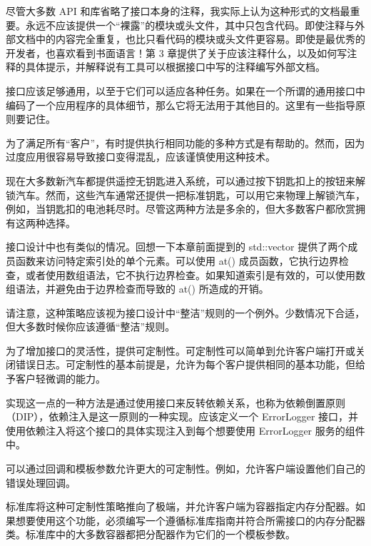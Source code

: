 尽管大多数 API 和库省略了接口本身的注释，我实际上认为这种形式的文档最重要。永远不应该提供一个“裸露”的模块或头文件，其中只包含代码。即使注释与外部文档中的内容完全重复，也比只看代码的模块或头文件更容易。即使是最优秀的开发者，也喜欢看到书面语言！第 3 章提供了关于应该注释什么，以及如何写注释的具体提示，并解释说有工具可以根据接口中写的注释编写外部文档。


接口应该足够通用，以至于它们可以适应各种任务。如果在一个所谓的通用接口中编码了一个应用程序的具体细节，那么它将无法用于其他目的。这里有一些指导原则要记住。


为了满足所有“客户”，有时提供执行相同功能的多种方式是有帮助的。然而，因为过度应用很容易导致接口变得混乱，应该谨慎使用这种技术。

现在大多数新汽车都提供遥控无钥匙进入系统，可以通过按下钥匙扣上的按钮来解锁汽车。然而，这些汽车通常还提供一把标准钥匙，可以用它来物理上解锁汽车，例如，当钥匙扣的电池耗尽时。尽管这两种方法是多余的，但大多数客户都欣赏拥有这两种选择。

接口设计中也有类似的情况。回想一下本章前面提到的 std::vector 提供了两个成员函数来访问特定索引处的单个元素。可以使用 at() 成员函数，它执行边界检查，或者使用数组语法，它不执行边界检查。如果知道索引是有效的，可以使用数组语法，并避免由于边界检查而导致的 at() 所造成的开销。

请注意，这种策略应该视为接口设计中“整洁”规则的一个例外。少数情况下合适，但大多数时候你应该遵循“整洁”规则。


为了增加接口的灵活性，提供可定制性。可定制性可以简单到允许客户端打开或关闭错误日志。可定制性的基本前提是，允许为每个客户提供相同的基本功能，但给予客户轻微调的能力。

实现这一点的一种方法是通过使用接口来反转依赖关系，也称为依赖倒置原则（DIP），依赖注入是这一原则的一种实现。应该定义一个 ErrorLogger 接口，并使用依赖注入将这个接口的具体实现注入到每个想要使用 ErrorLogger 服务的组件中。

可以通过回调和模板参数允许更大的可定制性。例如，允许客户端设置他们自己的错误处理回调。

标准库将这种可定制性策略推向了极端，并允许客户端为容器指定内存分配器。如果想要使用这个功能，必须编写一个遵循标准库指南并符合所需接口的内存分配器类。标准库中的大多数容器都把分配器作为它们的一个模板参数。


